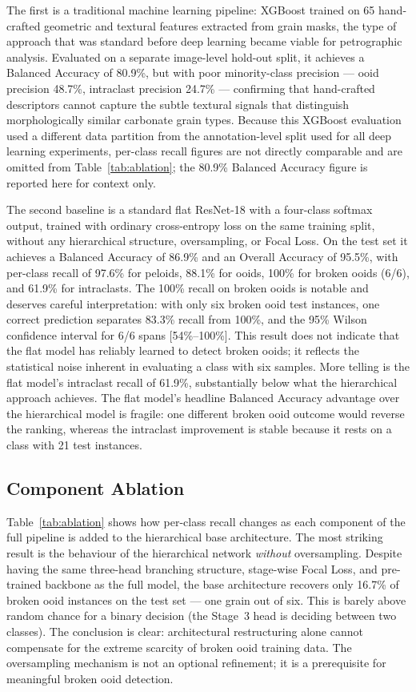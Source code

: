 \documentclass[a4paper,fleqn]{cas-dc}
\begin{document}
The first is a traditional machine learning pipeline: XGBoost trained on 65 hand-crafted geometric and textural features extracted from grain masks, the type of approach that was standard before deep learning became viable for petrographic analysis. Evaluated on a separate image-level hold-out split, it achieves a Balanced Accuracy of 80.9\%, but with poor minority-class precision --- ooid precision 48.7\%, intraclast precision 24.7\% --- confirming that hand-crafted descriptors cannot capture the subtle textural signals that distinguish morphologically similar carbonate grain types. Because this XGBoost evaluation used a different data partition from the annotation-level split used for all deep learning experiments, per-class recall figures are not directly comparable and are omitted from Table~\ref{tab:ablation}; the 80.9\% Balanced Accuracy figure is reported here for context only.

The second baseline is a standard flat ResNet-18 with a four-class softmax output, trained with ordinary cross-entropy loss on the same training split, without any hierarchical structure, oversampling, or Focal Loss. On the test set it achieves a Balanced Accuracy of 86.9\% and an Overall Accuracy of 95.5\%, with per-class recall of 97.6\% for peloids, 88.1\% for ooids, 100\% for broken ooids (6/6), and 61.9\% for intraclasts. The 100\% recall on broken ooids is notable and deserves careful interpretation: with only six broken ooid test instances, one correct prediction separates 83.3\% recall from 100\%, and the 95\% Wilson confidence interval for 6/6 spans [54\%--100\%]. This result does not indicate that the flat model has reliably learned to detect broken ooids; it reflects the statistical noise inherent in evaluating a class with six samples. More telling is the flat model's intraclast recall of 61.9\%, substantially below what the hierarchical approach achieves. The flat model's headline Balanced Accuracy advantage over the hierarchical model is fragile: one different broken ooid outcome would reverse the ranking, whereas the intraclast improvement is stable because it rests on a class with 21 test instances.

\subsection{Component Ablation}
\label{sec:results_ablation}
Table~\ref{tab:ablation} shows how per-class recall changes as each component of the full pipeline is added to the hierarchical base architecture. The most striking result is the behaviour of the hierarchical network \textit{without} oversampling. Despite having the same three-head branching structure, stage-wise Focal Loss, and pre-trained backbone as the full model, the base architecture recovers only 16.7\% of broken ooid instances on the test set --- one grain out of six. This is barely above random chance for a binary decision (the Stage~3 head is deciding between two classes). The conclusion is clear: architectural restructuring alone cannot compensate for the extreme scarcity of broken ooid training data. The oversampling mechanism is not an optional refinement; it is a prerequisite for meaningful broken ooid detection.
\end{document}
